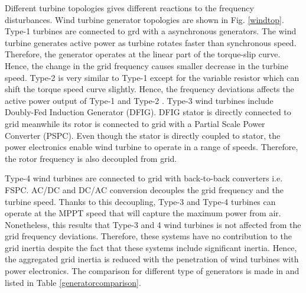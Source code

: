 Different turbine topologies gives different reactions to the frequency disturbances. Wind turbine generator topologies are shown in Fig. \ref{windtop}. Type-1 turbines are connected to grd with a asynchronous generators. The wind turbine generates active power as turbine rotates faster than synchronous speed. Therefore, the generator operates at the linear part of the torque-slip curve. Hence, the change in the grid frequency causes smaller decrease in the turbine speed. Type-2 is very similar to Type-1 except for the variable resistor which can shift the torque speed curve slightly. Hence, the frequency deviations affects the active power output of Type-1 and Type-2 \cite{Muljadi2012}. Type-3 wind turbines include Doubly-Fed Induction Generator (DFIG). DFIG stator is directly connected to grid meanwhile its rotor is connected to grid with a Partial Scale Power Converter (PSPC). Even though the stator is directly coupled to stator, the power electronics enable wind turbine to operate in a range of speeds. Therefore, the rotor frequency is also decoupled from grid.\par Type-4 wind turbines are connected to grid with back-to-back converters i.e. FSPC. AC/DC and DC/AC conversion decouples the grid frequency and the turbine speed. Thanks to this decoupling, Type-3 and Type-4 turbines can operate at the MPPT speed that will capture the maximum power from air. Nonetheless, this results that Type-3 and 4 wind turbines is not affected from the grid frequency deviations. Therefore, these systems have no contribution to the grid inertia despite the fact that these systems include significant inertia. Hence, the aggregated grid inertia is reduced with the penetration of wind turbines with power electronics. The comparison for different type of generators is made in \cite{VanDeVyver2016} and listed in Table \ref{generatorcomparison}.\par  
